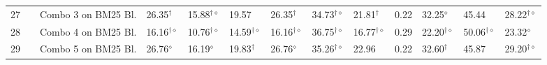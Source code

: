 \begin{table*}
{\begin{tabular}{cclllllllllll}
27  &  & Combo 3 on BM25 Bl.  & 26.35$^{\dagger}$  & 15.88$^{\dagger\diamond}$  & 19.57  & 26.35$^{\dagger}$  & 34.73$^{\dagger\diamond}$  & 21.81$^{\dagger}$  & 0.22  & 32.25$^{\diamond}$  & 45.44  & 28.22$^{\dagger\diamond}$\tabularnewline
28  &  & Combo 4 on BM25 Bl.  & 16.16$^{\dagger\diamond}$  & 10.76$^{\dagger\diamond}$  & 14.59$^{\dagger\diamond}$  & 16.16$^{\dagger\diamond}$  & 36.75$^{\dagger\diamond}$  & 16.77$^{\dagger\diamond}$  & 0.29  & 22.20$^{\dagger\diamond}$  & 50.06$^{\dagger\diamond}$  & 23.32$^{\diamond}$\tabularnewline
29  &  & Combo 5 on BM25 Bl.  & 26.76$^{\diamond}$  & 16.19$^{\diamond}$  & 19.83$^{\dagger}$  & 26.76$^{\diamond}$  & 35.26$^{\dagger\diamond}$  & 22.96  & 0.22  & 32.60$^{\dagger}$  & 45.87  & 29.20$^{\dagger\diamond}$\tabularnewline
\bottomrule
\end{tabular}} %
\end{table*}
